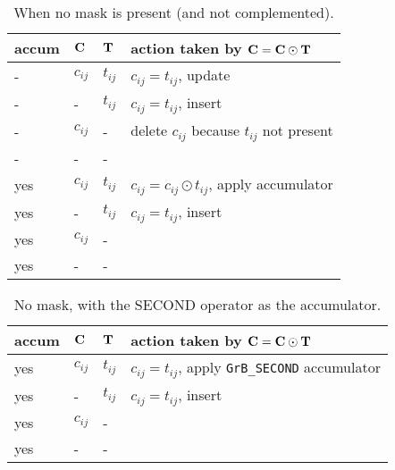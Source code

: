 \documentclass[12pt]{article}
\begin{document}
{\begin{table}[h]
\begin{center}
{\small
\begin{tabular}{lll|l}
\hline
       accum & ${\bf C}$ & ${\bf T}$        & action taken by ${\bf C = C \odot T}$ \\
\hline
        -   & $c_{ij}$ & $t_{ij}$         &  $c_{ij} = t_{ij}$, update \\
        -   &  -       & $t_{ij}$         &  $c_{ij} = t_{ij}$, insert \\
        -   & $c_{ij}$ &  -               &  delete $c_{ij}$ because $t_{ij}$ not present \\
        -   &  -       &  -               &   \\
\hline
        yes & $c_{ij}$ & $t_{ij}$         &  $c_{ij} = c_{ij} \odot t_{ij}$, apply accumulator \\
        yes &  -       & $t_{ij}$         &  $c_{ij} = t_{ij}$, insert \\
        yes & $c_{ij}$ &  -               &   \\
        yes &  -       &  -               &   \\
\hline
\end{tabular}
}
\caption{When no mask is present (and not complemented).
\label{tab:maskaccum_nomask}}
\end{center}
\end{table}

\begin{table}[h]
\begin{center}
{\small
\begin{tabular}{lll|l}
\hline
       accum & ${\bf C}$ & ${\bf T}$        & action taken by ${\bf C = C \odot T}$ \\
\hline
        yes & $c_{ij}$ & $t_{ij}$         &  $c_{ij} = t_{ij}$, apply \verb'GrB_SECOND' accumulator \\
        yes &  -       & $t_{ij}$         &  $c_{ij} = t_{ij}$, insert \\
        yes & $c_{ij}$ &  -               &   \\
        yes &  -       &  -               &   \\
\hline
\end{tabular}
}
\caption{No mask, with the SECOND operator as the accumulator.
\label{tab:maskaccum_nomask_2nd}}
\end{center}
\end{table}

}
\end{document}
